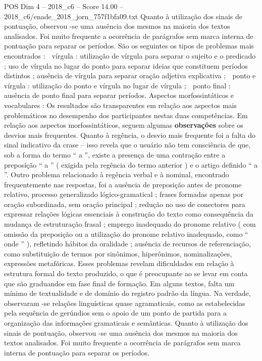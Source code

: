 \begin{textsample}{POS Dim 4 – 2018\_c6 – Score 14.00 – 2018\_c6/enade\_2018\_jorn\_757f1bfa09.txt}
Quanto à utilização dos sinais de pontuação, observou -se uma ausência dos mesmos na maioria dos textos analisados.
Foi muito frequente a ocorrência de parágrafos sem marca interna de pontuação para separar os períodos.
São os seguintes os tipos de problemas mais encontrados :  vírgula : utilização de vírgula para separar o sujeito e o predicado ; uso de vírgula no lugar do ponto para separar ideias que constituem períodos distintos ; ausência de vírgula para separar oração adjetiva explicativa ;  ponto e vírgula : utilização do ponto e vírgula no lugar de vírgula ;  ponto final : ausência de ponto final para separar períodos.
Aspectos morfossintáticos e vocabulares : Os resultados são transparentes em relação aos aspectos mais problemáticos no desempenho dos participantes nestas duas competências.
Em relação aos aspectos morfossintáticos, seguem algumas \textbf{observações} sobre os desvios mais frequentes.
Quanto à regência, o desvio mais frequente foi a falta do sinal indicativo da crase – isso revela que o usuário não tem consciência de que, sob a forma do termo “ a ”, existe a presença de uma contração entre a preposição “ a ” ( exigida pela regência do termo anterior ) e o artigo definido “ a ”.
Outro problema relacionado à regência verbal e à nominal, encontrado frequentemente nas respostas, foi a ausência de preposição antes de pronome relativo, processo generalizado lógico-gramatical ; frases formadas apenas por oração subordinada, sem oração principal ; redução no uso de conectores para expressar relações lógicas essenciais à construção do texto como consequência da mudança de estruturação frasal ; emprego inadequado do pronome relativo ( com omissão da preposição ou a utilização do pronome relativo inadequado, como “ onde ” ), refletindo hábitos da oralidade ; ausência de recursos de referenciação, como substituição de termos por sinônimos, hiperônimos, nominalizações, expressões metafóricas.
Esses problemas revelam dificuldades em relação à estrutura formal do texto produzido, o que é preocupante ao se levar em conta que são graduandos em fase final de formação.
Em alguns textos, falta um mínimo de textualidade e de domínio do registro padrão da língua.
Na verdade, observaram -se relações linguísticas quase agramaticais, como as estabelecidas pela sequência de gerúndios sem o apoio de um ponto de partida para a organização das informações gramaticais e semânticas.
Quanto à utilização dos sinais de pontuação, observou -se uma ausência dos mesmos na maioria dos textos analisados.
Foi muito frequente a ocorrência de parágrafos sem marca interna de pontuação para separar os períodos.

\end{textsample}
